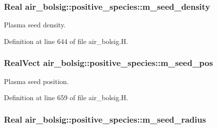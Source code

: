 \subsubsection[{\texorpdfstring{m\+\_\+seed\+\_\+density}{m_seed_density}}]{\setlength{\rightskip}{0pt plus 5cm}Real air\+\_\+bolsig\+::positive\+\_\+species\+::m\+\_\+seed\+\_\+density}\hypertarget{classair__bolsig_1_1positive__species_a4c9f2973330fa9f878bb82583da6bc23}{}\label{classair__bolsig_1_1positive__species_a4c9f2973330fa9f878bb82583da6bc23}


Plasma seed density. 



Definition at line 644 of file air\+\_\+bolsig.\+H.

\subsubsection[{\texorpdfstring{m\+\_\+seed\+\_\+pos}{m_seed_pos}}]{\setlength{\rightskip}{0pt plus 5cm}Real\+Vect air\+\_\+bolsig\+::positive\+\_\+species\+::m\+\_\+seed\+\_\+pos}\hypertarget{classair__bolsig_1_1positive__species_a8748bdb99cef38084b497e29bac50959}{}\label{classair__bolsig_1_1positive__species_a8748bdb99cef38084b497e29bac50959}


Plasma seed position. 



Definition at line 659 of file air\+\_\+bolsig.\+H.

\subsubsection[{\texorpdfstring{m\+\_\+seed\+\_\+radius}{m_seed_radius}}]{\setlength{\rightskip}{0pt plus 5cm}Real air\+\_\+bolsig\+::positive\+\_\+species\+::m\+\_\+seed\+\_\+radius}\hypertarget{classair__bolsig_1_1positive__species_a56070e0f4de4033f9177ab2826ea0ccd}{}\label{classair__bolsig_1_1positive__species_a56070e0f4de4033f9177ab2826ea0ccd}


